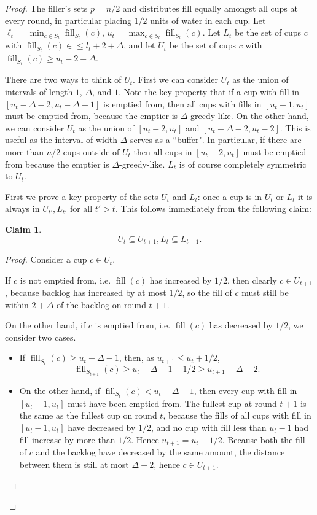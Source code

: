 \documentclass[twocolumn]{article}[10pt]
\DeclareMathOperator{\fil}{\text{fill}}
\newtheorem{clm}{Claim}
\begin{document}
\begin{proof}
  The filler's sets $p=n/2$ and distributes fill equally amongst
  all cups at every round, in particular placing $1/2$ units of water in each cup.
  Let $\ell_t = \min_{c\in S_t} \fil_{S_t}(c)$, $u_t=\max_{c\in S_t} \fil_{S_t}(c)$. Let
  $L_t$ be the set of cups $c$ with $\fil_{S_t}(c) \in \le l_t+2+\Delta$, and let
  $U_t$ be the set of cups $c$ with $\fil_{S_t}(c) \ge u_t-2-\Delta$.

  There are two ways to think of $U_t$.
  First we can consider $U_t$ as the union of intervals of length $1$,
  $\Delta$, and $1$. Note the key property that if a cup with fill in
  $[u_t-\Delta-2, u_t-\Delta-1]$ is emptied from, then all cups with fills in 
  $[u_t-1, u_t]$ must be emptied from, because the emptier is $\Delta$-greedy-like.
  On the other hand, we can consider $U_t$ as the union of $[u_t-2, u_t]$ and
  $[u_t-\Delta-2, u_t-2]$. This is useful as the interval of width $\Delta$
  serves as a ``buffer". In particular, if there are more than $n/2$ cups
  outside of $U_t$ then all cups in $[u_t-2, u_t]$ must be emptied from because
  the emptier is $\Delta$-greedy-like. $L_t$ is of course completely symmetric to $U_t$.

  First we prove a key property of the sets $U_t$ and $L_t$: once a cup is in
  $U_t$ or $L_t$ it is always in $U_{t'}, L_{t'}$ for all $t' > t$. This
  follows immediately from the following claim:
  \begin{clm}
    \label{clm:dontlosestuff}
    $$U_{t} \subseteq U_{t+1}, L_t \subseteq L_{t+1}.$$
  \end{clm}
  \begin{proof}
    Consider a cup $c\in U_t$.

    If $c$ is not emptied from, i.e. $\fil(c)$ has increased by $1/2$, then
    clearly $c \in U_{t+1}$, because backlog has increased by at most $1/2$, so
    the fill of $c$ must still be within $2+\Delta$ of the backlog on round $t+1$. 

    On the other hand, if $c$ is emptied from, i.e. $\fil(c)$ has decreased by
    $1/2$, we consider two cases.
    \begin{itemize}
      \item If $\fil_{S_t}(c) \ge u_t-\Delta -1$, then, as $u_{t+1} \le u_t+1/2$, 
        $$\fil_{S_{t+1}}(c) \ge u_t-\Delta-1 - 1/2\ge u_{t+1}-\Delta-2.$$
      \item On the other hand, if $\fil_{S_t}(c) < u_t-\Delta-1$, then every cup
        with fill in $[u_t-1, u_t]$ must have been emptied
        from. The fullest cup at round $t+1$ is the same as the fullest cup on
        round $t$, because the fills of all cups with fill in
        $[u_t-1, u_t]$ have decreased by $1/2$, and no cup with fill less than
        $u_t-1$ had fill increase by more than $1/2$. Hence $u_{t+1} = u_t -1/2$.
        Because both the fill of $c$ and the backlog have decreased by the same
        amount, the distance between them is still at most $\Delta+2$, hence
        $c\in U_{t+1}$.
    \end{itemize}


\end{proof}
\end{proof}
\end{document}
